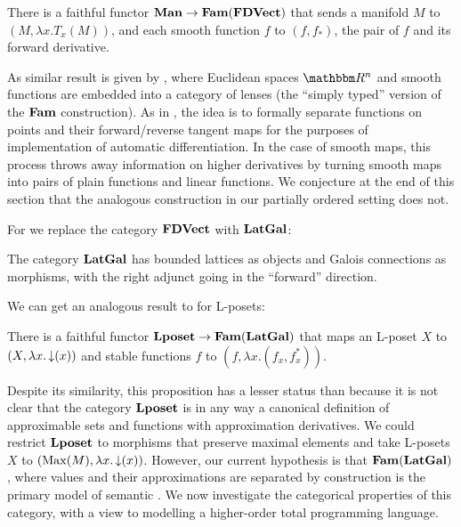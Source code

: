 \begin{proposition}
  \label{prop:embed-manifolds}
  There is a faithful functor $\mathbf{Man} \to \mathbf{Fam}(\mathbf{FDVect})$ that sends a
  manifold $M$ to $(M, \lambda x. T_x(M))$, and each smooth function
  $f$ to $(f, f_*)$, the pair of $f$ and its forward derivative.
\end{proposition}

As similar result is given by \citet{cruttwell2022}, where Euclidean
spaces $\RR^n$ and smooth functions are embedded into a category of
lenses (the ``simply typed'' version of the $\mathbf{Fam}$ construction). As
in \cite{vakar2021}, the idea is to formally separate functions on
points and their forward/reverse tangent maps for the purposes of
implementation of automatic differentiation. In the case of smooth
maps, this process throws away information on higher derivatives by
turning smooth maps into pairs of plain functions and linear
functions. We conjecture at the end of this section that the analogous
construction in our partially ordered setting does not.

For \GPS we replace the category $\mathbf{FDVect}$ with $\mathbf{LatGal}$:

\begin{definition}
  The category $\mathbf{LatGal}$ has bounded lattices as objects and Galois
  connections as morphisms, with the right adjunct going in the
  ``forward'' direction.
\end{definition}

We can get an analogous result to  for L-posets:

\begin{proposition}
  There is a faithful functor $\mathbf{Lposet} \to \mathbf{Fam}(\mathbf{LatGal})$ that maps an
  L-poset $X$ to $(X, \lambda x. \mathop{\downarrow}(x))$ and stable functions
  $f$ to $(f, \lambda x. (f_x, f^*_x))$.
\end{proposition}

Despite its similarity, this proposition has a lesser status than
 because it is not clear that the category
$\mathbf{Lposet}$ is in any way a canonical definition of approximable sets
and functions with approximation derivatives. We could restrict
$\mathbf{Lposet}$ to morphisms that preserve maximal elements and take
L-posets $X$ to $(\mathrm{Max}(M), \lambda x. \mathop{\downarrow}(x))$. However,
our current hypothesis is that $\mathbf{Fam}(\mathbf{LatGal})$, where values and their
approximations are separated by construction is the primary model of
semantic \GPS. We now investigate the categorical properties of this
category, with a view to modelling a higher-order total programming
language.

